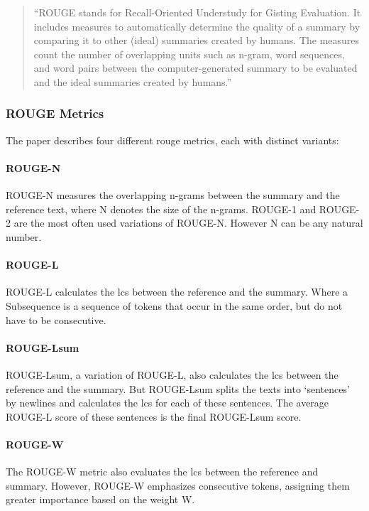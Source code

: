 \label{sec:rouge_theory}

\begin{quote}
``ROUGE stands for Recall-Oriented Understudy for Gisting Evaluation. It includes measures to automatically determine the quality of a summary by comparing it to other (ideal) summaries created by humans. The measures count the number of overlapping units such as n-gram, word sequences, and word pairs between the computer-generated summary to be evaluated and the ideal summaries created by humans.'' \parencite{lin-2004-rouge}
\end{quote}

\subsubsection{ROUGE Metrics}
The paper describes four different \gls{rouge} metrics, each with distinct variants:
\paragraph{ROUGE-N}
ROUGE-N measures the overlapping \glspl{n-gram} between the summary and the reference text, where N denotes the size of the \glspl{n-gram}. ROUGE-1 and ROUGE-2 are the most often used variations of ROUGE-N. However N can be any natural number.
\paragraph{ROUGE-L}
ROUGE-L calculates the \gls{lcs} between the reference and the summary. Where a Subsequence is a sequence of \glspl{token} that occur in the same order, but do not have to be consecutive.
\paragraph{ROUGE-Lsum}
ROUGE-Lsum, a variation of ROUGE-L, also calculates the \gls{lcs} between the reference and the summary. But ROUGE-Lsum splits the texts into `sentences' by newlines and calculates the \gls{lcs} for each of these sentences. The average ROUGE-L score of these sentences is the final ROUGE-Lsum score.
\paragraph{ROUGE-W}
The ROUGE-W metric also evaluates the \gls{lcs} between the reference and summary. However, ROUGE-W emphasizes consecutive \glspl{token}, assigning them greater importance based on the weight W.
